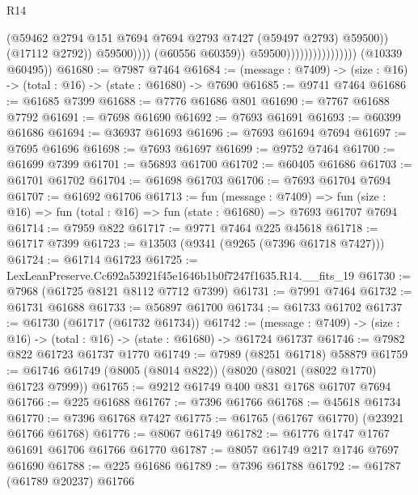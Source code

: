\begin{lexlean}{R14}
\begin{coremodule}
                                                    (@59462
                                                      @2794
                                                      @151
                                                      @7694
                                                      @7694
                                                      @2793
                                                      @7427
                                                      (@59497 @2793)
                                                      @59500))
                                                  (@17112 @2792))
                                                @59500))))
                                        (@60556 @60359))
                                      @59500))))))))))))))))
      (@10339 @60495))
@61680 := @7987 @7464
@61684 := (message : @7409) -> (size : @16) -> (total : @16) -> (state : @61680) -> @7690
@61685 := @9741 @7464
@61686 := @61685 @7399
@61688 := @7776 @61686 @801
@61690 := @7767 @61688 @7792
@61691 := @7698 @61690
@61692 := @7693 @61691
@61693 := @60399 @61686
@61694 := @36937 @61693
@61696 := @7693 @61694 @7694
@61697 := @7695 @61696
@61698 := @7693 @61697
@61699 := @9752 @7464
@61700 := @61699 @7399
@61701 := @56893 @61700
@61702 := @60405 @61686
@61703 := @61701 @61702
@61704 := @61698 @61703
@61706 := @7693 @61704 @7694
@61707 := @61692 @61706
@61713 := fun (message : @7409) =>
  fun (size : @16) => fun (total : @16) => fun (state : @61680) => @7693 @61707 @7694
@61714 := @7959 @822
@61717 := @9771 @7464 @225 @45618
@61718 := @61717 @7399
@61723 := @13503 (@9341 (@9265 (@7396 @61718 @7427)))
@61724 := @61714 @61723
@61725 := LexLeanPreserve.Cc692a53921f45e1646b1b0f7247f1635.R14.__fits_19
@61730 := @7968 (@61725 @8121 @8112 @7712 @7399)
@61731 := @7991 @7464
@61732 := @61731 @61688
@61733 := @56897 @61700
@61734 := @61733 @61702
@61737 := @61730 (@61717 (@61732 @61734))
@61742 := (message : @7409) -> (size : @16) -> (total : @16) -> (state : @61680) -> @61724 @61737
@61746 := @7982 @822 @61723 @61737 @1770
@61749 := @7989 (@8251 @61718) @58879
@61759 := @61746 @61749 (@8005 (@8014 @822)) (@8020 (@8021 (@8022 @1770) @61723 @7999))
@61765 := @9212 @61749 @400 @831 @1768 @61707 @7694
@61766 := @225 @61688
@61767 := @7396 @61766
@61768 := @45618 @61734
@61770 := @7396 @61768 @7427
@61775 := @61765 (@61767 @61770) (@23921 @61766 @61768)
@61776 := @8067 @61749
@61782 := @61776 @1747 @1767 @61691 @61706 @61766 @61770
@61787 := @8057 @61749 @217 @1746 @7697 @61690
@61788 := @225 @61686
@61789 := @7396 @61788
@61792 := @61787 (@61789 @20237) @61766

\end{coremodule}
\end{lexlean}
